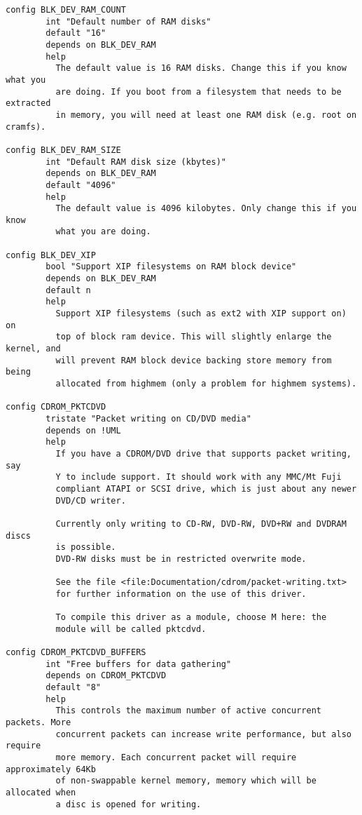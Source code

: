 \documentclass[journal,10pt,onecolumn,compsoc,letterpaper,draftclsnofoot,table,xcdraw]{IEEEtran} \usepackage[margin=0.75in]{geometry}
\begin{document}
\begin{verbatim}
config BLK_DEV_RAM_COUNT
        int "Default number of RAM disks"
        default "16"
        depends on BLK_DEV_RAM
        help
          The default value is 16 RAM disks. Change this if you know what you
          are doing. If you boot from a filesystem that needs to be extracted
          in memory, you will need at least one RAM disk (e.g. root on cramfs).

config BLK_DEV_RAM_SIZE
        int "Default RAM disk size (kbytes)"
        depends on BLK_DEV_RAM
        default "4096"
        help
          The default value is 4096 kilobytes. Only change this if you know
          what you are doing.

config BLK_DEV_XIP
        bool "Support XIP filesystems on RAM block device"
        depends on BLK_DEV_RAM
        default n
        help
          Support XIP filesystems (such as ext2 with XIP support on) on
          top of block ram device. This will slightly enlarge the kernel, and
          will prevent RAM block device backing store memory from being
          allocated from highmem (only a problem for highmem systems).

config CDROM_PKTCDVD
        tristate "Packet writing on CD/DVD media"
        depends on !UML
        help
          If you have a CDROM/DVD drive that supports packet writing, say
          Y to include support. It should work with any MMC/Mt Fuji
          compliant ATAPI or SCSI drive, which is just about any newer
          DVD/CD writer.

          Currently only writing to CD-RW, DVD-RW, DVD+RW and DVDRAM discs
          is possible.
          DVD-RW disks must be in restricted overwrite mode.

          See the file <file:Documentation/cdrom/packet-writing.txt>
          for further information on the use of this driver.

          To compile this driver as a module, choose M here: the
          module will be called pktcdvd.

config CDROM_PKTCDVD_BUFFERS
        int "Free buffers for data gathering"
        depends on CDROM_PKTCDVD
        default "8"
        help
          This controls the maximum number of active concurrent packets. More
          concurrent packets can increase write performance, but also require
          more memory. Each concurrent packet will require approximately 64Kb
          of non-swappable kernel memory, memory which will be allocated when
          a disc is opened for writing.


\end{verbatim}
\end{document}
